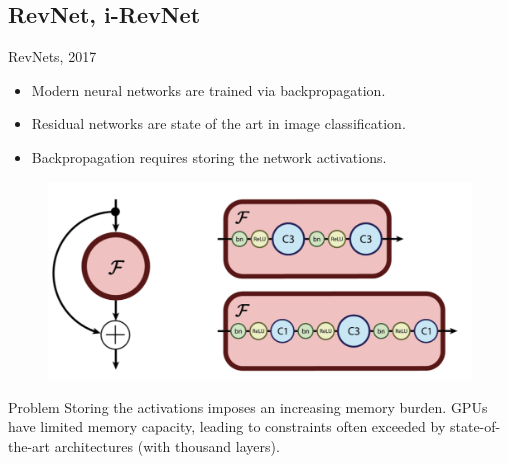 \subsection{RevNet, i-RevNet}
\begin{frame}{RevNets, 2017}
	\begin{minipage}[t]{0.6\columnwidth}
		\begin{itemize}
			\item Modern neural networks are trained via backpropagation.
			\item Residual networks are state of the art in image classification.
			\item Backpropagation requires storing the network activations.
		\end{itemize}
	\end{minipage}%
	\begin{minipage}[t]{0.4\columnwidth}
		\begin{figure}
			\centering
			\includegraphics[width=\linewidth]{figs/resnet_block.png}
		\end{figure}
	\end{minipage}
	\vspace{0.1cm}
	\begin{block}{Problem}
		Storing the activations imposes an increasing memory burden. GPUs have limited memory capacity, leading to constraints often exceeded by state-of-the-art architectures (with thousand layers).
	\end{block}
\end{frame}
